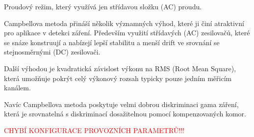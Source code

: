 Proudový režim, který využívá jen střídavou
složku (AC) proudu.

Campbellova metoda přináší několik významných výhod, které ji činí atraktivní pro aplikace v detekci záření. Především využití střídavých (AC) zesilovačů, které se snáze konstruují a nabízejí lepší stabilitu a menší drift ve srovnání se stejnosměrnými (DC) zesilovači.

Další výhodou je kvadratická závislost výkonu na RMS (Root Mean Square), která umožňuje pokrýt celý výkonový rozsah typicky pouze jedním měřicím kanálem.

Navíc Campbellova metoda poskytuje velmi dobrou diskriminaci gama záření, která je srovnatelná s diskriminací dosažitelnou pomocí kompenzovaných komor.

\textcolor{red}{CHYBÍ KONFIGURACE PROVOZNÍCH PARAMETRŮ!!!} 


